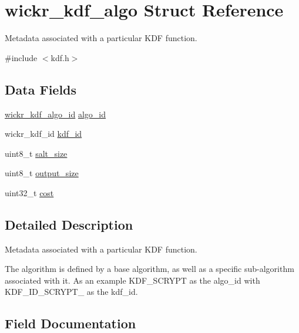 \hypertarget{structwickr__kdf__algo}{}\section{wickr\+\_\+kdf\+\_\+algo Struct Reference}
\label{structwickr__kdf__algo}


Metadata associated with a particular K\+DF function.  




{\ttfamily \#include $<$kdf.\+h$>$}

\subsection*{Data Fields}
\begin{DoxyCompactItemize}
\item 
\hyperlink{group__wickr__kdf_ga106149e3507106abb6b5be843a4e7c16}{wickr\+\_\+kdf\+\_\+algo\+\_\+id} \hyperlink{structwickr__kdf__algo_a1bc420e2ca0f36169e261205bf6246e9}{algo\+\_\+id}
\item 
wickr\+\_\+kdf\+\_\+id \hyperlink{structwickr__kdf__algo_a0cf9976901115634ddbb6193b6e326ba}{kdf\+\_\+id}
\item 
uint8\+\_\+t \hyperlink{structwickr__kdf__algo_a9a6ccf9787e16898d1724292dab6593e}{salt\+\_\+size}
\item 
uint8\+\_\+t \hyperlink{structwickr__kdf__algo_a75e5396b3c53817c6799dbf3107e36d6}{output\+\_\+size}
\item 
uint32\+\_\+t \hyperlink{structwickr__kdf__algo_a3591ba4f7b6b916381ad28327a67d08c}{cost}
\end{DoxyCompactItemize}


\subsection{Detailed Description}
Metadata associated with a particular K\+DF function. 

The algorithm is defined by a base algorithm, as well as a specific sub-\/algorithm associated with it. As an example K\+D\+F\+\_\+\+S\+C\+R\+Y\+PT as the algo\+\_\+id with K\+D\+F\+\_\+\+I\+D\+\_\+\+S\+C\+R\+Y\+P\+T\+\_ as the kdf\+\_\+id. 

\subsection{Field Documentation}
\mbox{\label{structwickr__kdf__algo_a1bc420e2ca0f36169e261205bf6246e9}} 
